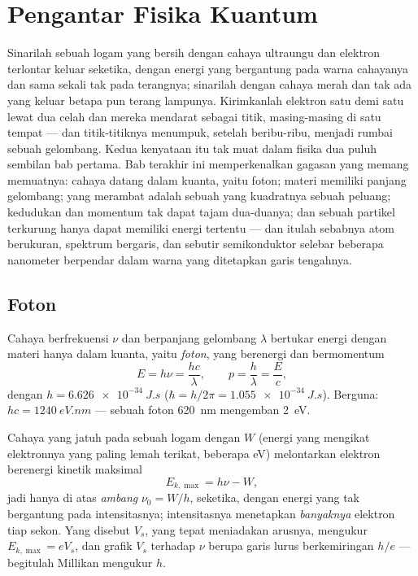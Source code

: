 \chapter{Pengantar Fisika Kuantum}\label{ch:b1:quantum-introduction}

Sinarilah sebuah logam yang bersih dengan cahaya ultraungu dan elektron
terlontar keluar seketika, dengan energi yang bergantung pada warna cahayanya dan
sama sekali tak pada terangnya; sinarilah dengan cahaya merah dan tak ada yang keluar
betapa pun terang lampunya. Kirimkanlah elektron satu demi satu lewat dua celah dan
mereka mendarat sebagai titik, masing-masing di satu tempat --- dan titik-titiknya
menumpuk, setelah beribu-ribu, menjadi rumbai sebuah gelombang. Kedua kenyataan itu
tak muat dalam fisika dua puluh sembilan bab pertama. Bab terakhir ini memperkenalkan
gagasan yang memang memuatnya: cahaya datang dalam kuanta, yaitu foton; materi memiliki
panjang gelombang; yang merambat adalah sebuah  yang kuadratnya sebuah
peluang; kedudukan dan momentum tak dapat tajam dua-duanya; dan sebuah partikel
terkurung hanya dapat memiliki energi tertentu --- dan itulah sebabnya atom
berukuran, spektrum bergaris, dan sebutir semikonduktor selebar beberapa
nanometer berpendar dalam warna yang ditetapkan garis tengahnya.

\section{Foton}

\begin{theorem}\label{thm:b1:quantum-introduction:photon}
Cahaya berfrekuensi $\nu$ dan berpanjang gelombang $\lambda$ bertukar energi dengan
materi hanya dalam kuanta, yaitu \emph{foton}, yang berenergi dan bermomentum
\[
E = h\nu = \frac{hc}{\lambda} , \qquad p = \frac{h}{\lambda} = \frac{E}{c} ,
\]
dengan \emph{} $h = \qty{6.626e-34}{J.s}$ ($\hbar = h/2\pi =
\qty{1.055e-34}{J.s}$). Berguna: $hc = \qty{1240}{eV.nm}$ --- sebuah foton
\qty{620}{nm} mengemban \qty{2}{eV}.
\end{theorem}
\admitted

\begin{proposition}\label{prop:b1:quantum-introduction:photoelectric}
Cahaya yang jatuh pada sebuah logam dengan \emph{} $W$ (energi yang
mengikat elektronnya yang paling lemah terikat, beberapa eV) melontarkan elektron
berenergi kinetik maksimal
\[
E_{k,\max} = h\nu - W ,
\]
jadi hanya di atas \emph{ambang} $\nu_0 = W/h$, seketika, dengan
energi yang tak bergantung pada intensitasnya; intensitasnya menetapkan
\emph{banyaknya} elektron tiap sekon. Yang disebut \emph{}
$V_s$, yang tepat meniadakan arusnya, mengukur $E_{k,\max} = eV_s$, dan
grafik $V_s$ terhadap $\nu$ berupa garis lurus berkemiringan $h/e$ --- begitulah
Millikan mengukur $h$.
\end{proposition}

